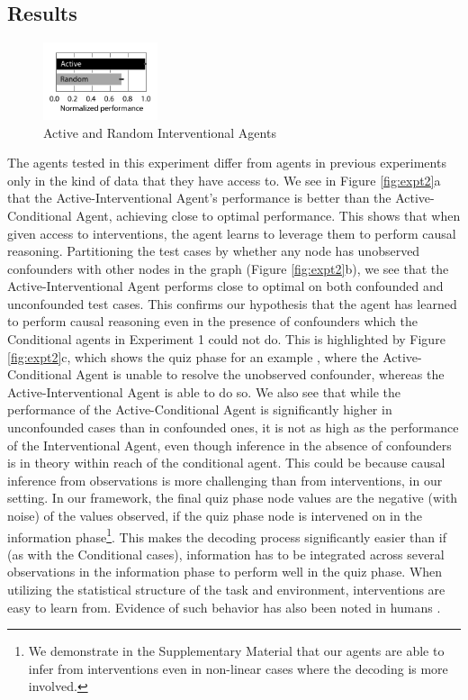 \subsection{Results}

\begin{figure}
\centering
\includegraphics[width=0.3\textwidth , trim = {0 0cm 0 0.9cm}]{figures/fig_causal_act_v_pass.pdf} 
\caption{Active and Random Interventional Agents}
\label{fig:expt2_active}
\end{figure}
The agents tested in this experiment differ from agents in previous experiments only in the kind of data that they have access to. We see in Figure \ref{fig:expt2}a that the Active-Interventional Agent's performance is better than the Active-Conditional Agent, achieving close to optimal performance. This shows that when given access to interventions, the agent learns to leverage them to perform causal reasoning. Partitioning the test cases by whether any node has unobserved confounders with other nodes in the graph (Figure \ref{fig:expt2}b), we see that the Active-Interventional Agent performs close to optimal on both confounded and unconfounded test cases. This confirms our hypothesis that the agent has learned to perform causal reasoning even in the presence of confounders which the Conditional agents in Experiment 1 could not do. This is highlighted by Figure \ref{fig:expt2}c, which shows the quiz phase for an example \CBN, where the Active-Conditional Agent is unable to resolve the unobserved confounder, whereas the Active-Interventional Agent is able to do so. We also see that while the performance of the Active-Conditional Agent is significantly higher in unconfounded cases than in confounded ones, it is not as high as the performance of the Interventional Agent, even though inference in the absence of confounders is in theory within reach of the conditional agent. This could be because causal inference from observations is more challenging than from interventions, in our setting. In our framework, the final quiz phase node values are the negative (with noise) of the values observed, if the quiz phase node is intervened on in the information phase\footnote{We demonstrate in the Supplementary Material that our agents are able to infer from interventions even in non-linear cases where the decoding is more involved.}. This makes the decoding process significantly easier than if (as with the Conditional cases), information has to be integrated across several observations in the information phase to perform well in the quiz phase. When utilizing the statistical structure of the task and environment, interventions are easy to learn from. Evidence of such behavior has also been noted in humans \citep{fernbach2013cognitive, fernbach2010neglect}.


